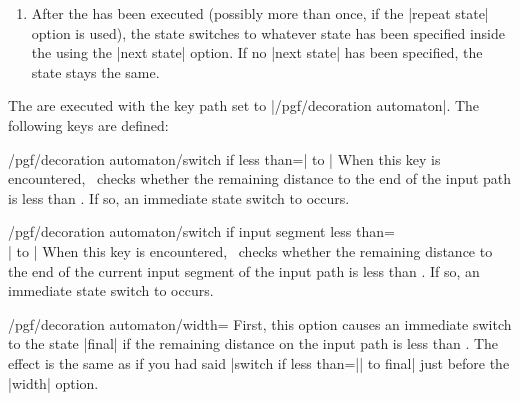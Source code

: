 \begin{command}{\pgfdeclaredecoration{}}
\begin{command}{\state{}}
\begin{enumerate}
\begin{codeexample}[]
\tikz\path[decorate, decoration=stars, star point ratio=2, star points=5,
           inner sep=0, minimum size=rnd*10pt+2pt]
  (0,0) .. controls (0,2)  and (3,2)  .. (3,0)
        .. controls (3,-3) and (0,0)  .. (0,-3)
        .. controls (0,-5) and (3,-5) .. (3,-3);
\end{codeexample}

    \item
      After the  has been executed (possibly more than
      once, if the |repeat state| option is used), the state switches to
      whatever state has been specified inside the 
      using the |next state| option. If no |next state| has been
      specified, the state stays the same.
    \end{enumerate}

    The  are executed with the key path set to
    |/pgf/decoration automaton|. The following keys are defined:
    \begin{key}{/pgf/decoration automaton/switch if less than=| to |}
      When this key is encountered, \pgfname\ checks whether the
      remaining distance to the end of the input path is less than
      . If so, an immediate state switch to  occurs.
    \end{key}
    \begin{key}{/pgf/decoration automaton/switch if input segment less than=\\| to |}
      When this key is encountered, \pgfname\ checks whether the
      remaining distance to the end of the current input segment of the
      input path is less than . If so, an immediate
      state switch to  occurs.
    \end{key}
    \begin{key}{/pgf/decoration automaton/width=}
      First, this option causes an immediate switch to the
      state |final| if the remaining distance on the input path is
      less than . The effect is the same as if you had
      said |switch if less than=|| to final| just
      before the |width| option.


\end{key}
\end{command}
\end{command}
